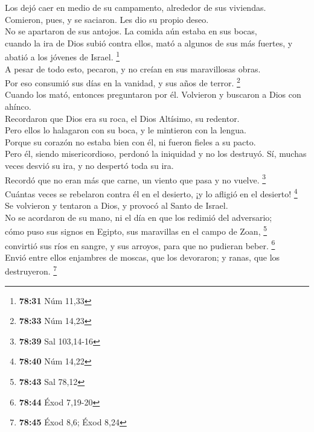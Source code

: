  Los dejó caer en medio de su campamento, alrededor de
sus viviendas.\\
 Comieron, pues, y se saciaron. Les dio su propio
deseo.\\
 No se apartaron de sus antojos. La comida aún estaba en
sus bocas,\\
 cuando la ira de Dios subió contra ellos, mató a algunos
de sus más fuertes, y abatió a los jóvenes de Israel. \footnote{\textbf{78:31}
  Núm 11,33}\\
 A pesar de todo esto, pecaron, y no creían en sus
maravillosas obras.\\
 Por eso consumió sus días en la vanidad, y sus años de
terror. \footnote{\textbf{78:33} Núm 14,23}\\
 Cuando los mató, entonces preguntaron por él. Volvieron
y buscaron a Dios con ahínco.\\
 Recordaron que Dios era su roca, el Dios Altísimo, su
redentor.\\
 Pero ellos lo halagaron con su boca, y le mintieron con
la lengua.\\
 Porque su corazón no estaba bien con él, ni fueron
fieles a su pacto.\\
 Pero él, siendo misericordioso, perdonó la iniquidad y
no los destruyó. Sí, muchas veces desvió su ira, y no despertó toda su
ira.\\
 Recordó que no eran más que carne, un viento que pasa y
no vuelve. \footnote{\textbf{78:39} Sal 103,14-16}\\
 Cuántas veces se rebelaron contra él en el desierto, ¡y
lo afligió en el desierto! \footnote{\textbf{78:40} Núm 14,22}\\
 Se volvieron y tentaron a Dios, y provocó al Santo de
Israel.\\
 No se acordaron de su mano, ni el día en que los redimió
del adversario;\\
 cómo puso sus signos en Egipto, sus maravillas en el
campo de Zoan, \footnote{\textbf{78:43} Sal 78,12}\\
 convirtió sus ríos en sangre, y sus arroyos, para que no
pudieran beber. \footnote{\textbf{78:44} Éxod 7,19-20}\\
 Envió entre ellos enjambres de moscas, que los
devoraron; y ranas, que los destruyeron. \footnote{\textbf{78:45} Éxod
  8,6; Éxod 8,24}\\
